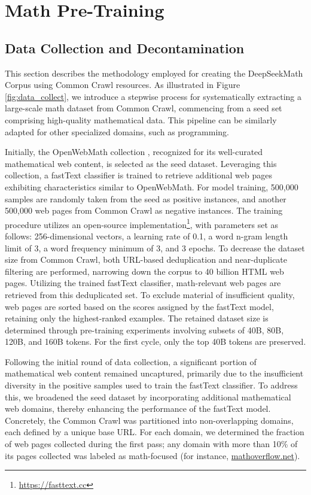 \section{Math Pre-Training}

\subsection{Data Collection and Decontamination} 

This section describes the methodology employed for creating the DeepSeekMath Corpus using Common Crawl resources. As illustrated in Figure \ref{fig:data_collect}, we introduce a stepwise process for systematically extracting a large-scale math dataset from Common Crawl, commencing from a seed set comprising high-quality mathematical data. This pipeline can be similarly adapted for other specialized domains, such as programming.

Initially, the OpenWebMath collection \citep{openwebmath}, recognized for its well-curated mathematical web content, is selected as the seed dataset. Leveraging this collection, a fastText classifier \citep{joulin2016fasttext} is trained to retrieve additional web pages exhibiting characteristics similar to OpenWebMath. For model training, 500,000 samples are randomly taken from the seed as positive instances, and another 500,000 web pages from Common Crawl as negative instances. The training procedure utilizes an open-source implementation\footnote{\url{https://fasttext.cc}}, with parameters set as follows: 256-dimensional vectors, a learning rate of 0.1, a word n-gram length limit of 3, a word frequency minimum of 3, and 3 epochs. To decrease the dataset size from Common Crawl, both URL-based deduplication and near-duplicate filtering are performed, narrowing down the corpus to 40 billion HTML web pages. Utilizing the trained fastText classifier, math-relevant web pages are retrieved from this deduplicated set. To exclude material of insufficient quality, web pages are sorted based on the scores assigned by the fastText model, retaining only the highest-ranked examples. The retained dataset size is determined through pre-training experiments involving subsets of 40B, 80B, 120B, and 160B tokens. For the first cycle, only the top 40B tokens are preserved.

Following the initial round of data collection, a significant portion of mathematical web content remained uncaptured, primarily due to the insufficient diversity in the positive samples used to train the fastText classifier. To address this, we broadened the seed dataset by incorporating additional mathematical web domains, thereby enhancing the performance of the fastText model. Concretely, the Common Crawl was partitioned into non-overlapping domains, each defined by a unique base URL. For each domain, we determined the fraction of web pages collected during the first pass; any domain with more than 10\% of its pages collected was labeled as math-focused (for instance, \url{mathoverflow.net}). 

